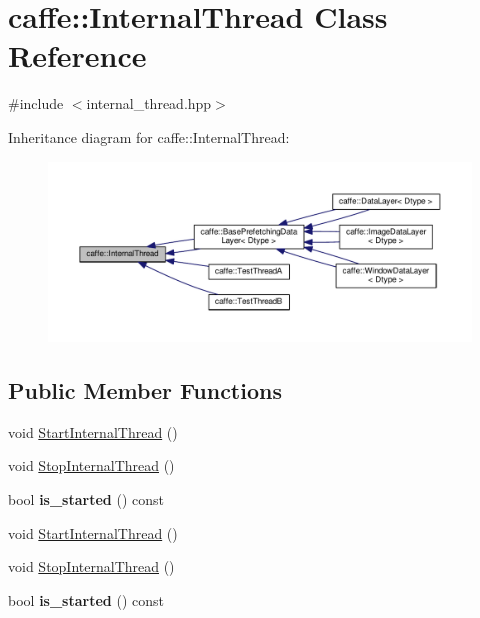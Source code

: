 \hypertarget{classcaffe_1_1_internal_thread}{}\section{caffe\+:\+:Internal\+Thread Class Reference}
\label{classcaffe_1_1_internal_thread}


{\ttfamily \#include $<$internal\+\_\+thread.\+hpp$>$}



Inheritance diagram for caffe\+:\+:Internal\+Thread\+:
\nopagebreak
\begin{figure}[H]
\begin{center}
\leavevmode
\includegraphics[width=350pt]{classcaffe_1_1_internal_thread__inherit__graph}
\end{center}
\end{figure}
\subsection*{Public Member Functions}
\begin{DoxyCompactItemize}
\item 
void \mbox{\hyperlink{classcaffe_1_1_internal_thread_acffc1d9bc9e78f4146ba2d16f593fca7}{Start\+Internal\+Thread}} ()
\item 
void \mbox{\hyperlink{classcaffe_1_1_internal_thread_ac72d8e2a23dbbe5203d5003dd67af73e}{Stop\+Internal\+Thread}} ()
\item 
\mbox{\label{classcaffe_1_1_internal_thread_aff6725ab240da9bd0d4c0e7183ce0cf2}} 
bool {\bfseries is\+\_\+started} () const
\item 
void \mbox{\hyperlink{classcaffe_1_1_internal_thread_acffc1d9bc9e78f4146ba2d16f593fca7}{Start\+Internal\+Thread}} ()
\item 
void \mbox{\hyperlink{classcaffe_1_1_internal_thread_ac72d8e2a23dbbe5203d5003dd67af73e}{Stop\+Internal\+Thread}} ()
\item 
\mbox{\label{classcaffe_1_1_internal_thread_aff6725ab240da9bd0d4c0e7183ce0cf2}} 
bool {\bfseries is\+\_\+started} () const
\end{DoxyCompactItemize}
